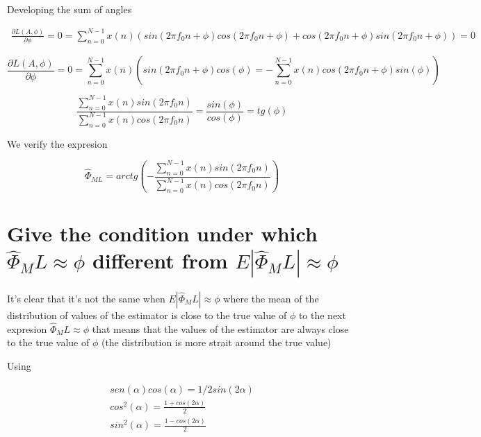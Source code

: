 \documentclass{report}
\begin{document}
Developing the sum of angles

\begin{gather*} 
\frac{\partial L(A,\phi)}{\partial \phi} = 0 = \sum_{n=0}^{N-1}x(n)(sin(2\pi f_0 n +\phi)cos(2\pi f_0 n +\phi) + cos(2\pi f_0 n +\phi)sin(2\pi f_0 n +\phi)) = 0
\end{gather*}

\begin{equation}\label{key}
\frac{\partial L(A,\phi)}{\partial \phi} = 0 = \sum_{n=0}^{N-1}x(n)(sin(2\pi f_0 n +\phi)cos(\phi) = - \sum_{n=0}^{N-1}x(n)cos(2\pi f_0 n +\phi)sin(\phi)) 
\end{equation}



\begin{equation}\label{key}
\frac{\sum_{n=0}^{N-1}x(n)sin(2\pi f_0 n)}{\sum_{n=0}^{N-1}x(n)cos(2\pi f_0 n )} = \frac{sin(\phi )}{cos(\phi)} = tg(\phi)
\end{equation}

We verify the expresion

\begin{equation}\label{key}
\hat{\Phi}_{ML} = arctg(-\frac{\sum_{n=0}^{N-1}x(n)sin(2\pi f_0 n)}{\sum_{n=0}^{N-1}x(n)cos(2\pi f_0 n )})
\end{equation}


\section{Give the condition under which $ \hat{\Phi}_ML \approx \phi $ 
different from $ E|\hat{\Phi}_ML| \approx \phi $ }

It's clear that it's not the same when $ E|\hat{\Phi}_ML| \approx \phi $  where 
the mean of the distribution of values of the estimator is close to the true 
value of $ \phi $ to the next expresion $ \hat{\Phi}_ML \approx \phi $ that 
means that the values of the estimator are always close to the true value of $ 
\phi $ (the distribution is more strait around the true value)

Using

\begin{gather*}
sen(\alpha)cos(\alpha) = 1/2 sin(2\alpha)\\
cos^2(\alpha) = \frac{1+cos(2\alpha)}{2}\\
sin^2(\alpha) = \frac{1-cos(2\alpha)}{2}
\end{gather*}
\end{document}
